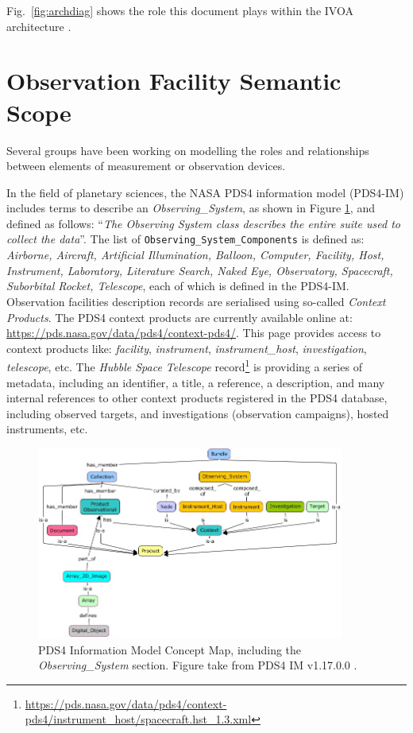 \documentclass[11pt,a4paper]{ivoa}
\begin{document}
Fig.~\ref{fig:archdiag} shows the role this document plays within the
IVOA architecture \citep{2010ivoa.rept.1123A}.

\section{Observation Facility Semantic Scope}
\label{sec:scope}

Several groups have been working on modelling the roles and 
relationships between elements of measurement or observation devices. 

In the field of planetary sciences, the NASA PDS4 information model 
(PDS4-IM) includes terms to describe an \emph{Observing\_System}, as 
shown in Figure \ref{fig:pds4-concept-map}, and defined as follows:
``\emph{The Observing System class describes the entire suite used to 
collect the data}''. The list of \texttt{Observing\_System\_Components} 
is
defined as: \emph{Airborne, Aircraft, Artificial Illumination, 
Balloon, Computer, Facility, Host, Instrument, Laboratory, Literature 
Search, Naked Eye, Observatory, Spacecraft, Suborbital Rocket, 
Telescope}, each of which is defined in the PDS4-IM. Observation 
facilities description records are serialised using so-called 
\emph{Context Products}. The PDS4 context products are currently available 
online at: \url{https://pds.nasa.gov/data/pds4/context-pds4/}. This 
page provides access to  context products like: \emph{facility}, 
\emph{instrument}, \emph{instrument\_host}, \emph{investigation}, 
\emph{telescope}, etc. The \emph{Hubble Space Telescope} 
record\footnote{\protect\url{https://pds.nasa.gov/data/pds4/context-pds4/instrument_host/spacecraft.hst_1.3.xml}} 
is providing a series of metadata, including an identifier, a title, 
a reference, a description, and many internal references to other 
context products registered in the PDS4 database, including 
observed targets, and investigations (observation campaigns), hosted 
instruments, etc.

\begin{figure}
\centering\includegraphics[width=0.9\textwidth]{pds4-concept-map.jpg}
\caption{PDS4 Information Model Concept Map, including the 
\emph{Observing\_System} section. Figure take from PDS4 IM v1.17.0.0 
\protect\citep{pds4-im-v1H00}.}\label{fig:pds4-concept-map}
\end{figure}
\end{document}
